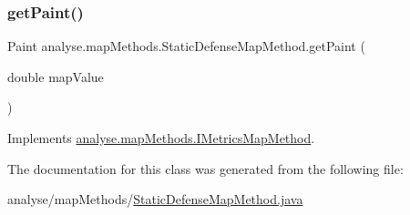\subsubsection{\texorpdfstring{get\+Paint()}{getPaint()}}
{\footnotesize\ttfamily Paint analyse.\+map\+Methods.\+Static\+Defense\+Map\+Method.\+get\+Paint (\begin{DoxyParamCaption}\item[{double}]{map\+Value }\end{DoxyParamCaption})\hspace{0.3cm}{\ttfamily [inline]}}



Implements \mbox{\hyperlink{interfaceanalyse_1_1map_methods_1_1_i_metrics_map_method_a102909023c32cebe3bc75052f55b24a0}{analyse.\+map\+Methods.\+I\+Metrics\+Map\+Method}}.



The documentation for this class was generated from the following file\+:\begin{DoxyCompactItemize}
\item 
analyse/map\+Methods/\mbox{\hyperlink{_static_defense_map_method_8java}{Static\+Defense\+Map\+Method.\+java}}\end{DoxyCompactItemize}
